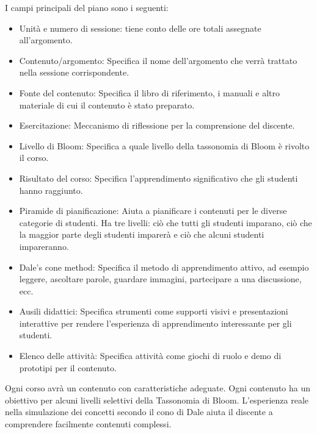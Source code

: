 I campi principali del piano sono i seguenti:
\begin{itemize}

\item Unità e numero di sessione: tiene conto delle ore totali assegnate all'argomento.
\item Contenuto/argomento: Specifica il nome dell'argomento che verrà trattato nella sessione corrispondente.
\item Fonte del contenuto: Specifica il libro di riferimento, i manuali e altro materiale di cui il contenuto è stato preparato.
\item Esercitazione: Meccanismo di riflessione per la comprensione del discente.
\item Livello di Bloom: Specifica a quale livello della tassonomia di Bloom è rivolto il corso.
\item Risultato del corso: Specifica l'apprendimento significativo che gli studenti hanno raggiunto.
\item Piramide di pianificazione: Aiuta a pianificare i contenuti per le diverse categorie di studenti. Ha tre livelli: ciò che tutti gli studenti imparano, ciò che la maggior parte degli studenti imparerà e ciò che alcuni studenti impareranno.

\item Dale's cone method: Specifica il metodo di apprendimento attivo, ad esempio leggere, ascoltare parole, guardare immagini, partecipare a una discussione, ecc.
\item Ausili didattici: Specifica strumenti come supporti visivi e presentazioni interattive per rendere l'esperienza di apprendimento interessante per gli studenti.
\item Elenco delle attività: Specifica attività come giochi di ruolo e demo di prototipi per il contenuto.
\end{itemize}
Ogni corso avrà un contenuto con caratteristiche adeguate. Ogni contenuto ha un obiettivo per alcuni livelli selettivi della Tassonomia di Bloom. L'esperienza reale nella simulazione dei concetti secondo il cono di Dale aiuta il discente a comprendere facilmente contenuti complessi.


